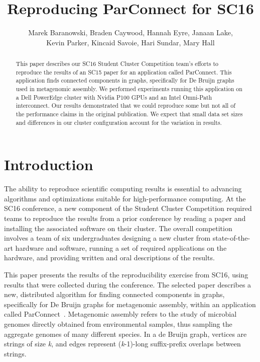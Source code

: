 \documentclass[11pt]{elsarticle}
\title{Reproducing ParConnect for SC16}
\author{Marek Baranowski, Braden Caywood, Hannah Eyre, Janaan Lake, \\Kevin Parker, Kincaid Savoie, Hari Sundar, Mary Hall}
\begin{document}
\begin{abstract}
This paper describes our SC16 Student Cluster Competition team's efforts to reproduce the results of
an SC15 paper for an application called ParConnect.  This application finds connected components in graphs, specifically for De Bruijn graphs used in metagenomic assembly. We performed experiments running this application on a Dell PowerEdge cluster with Nvidia P100 GPUs and an Intel Omni-Path interconnect. Our results demonstrated that we could reproduce some but not all of the performance claims in the
original publication.  We expect that small data set sizes and differences in our cluster configuration account for the variation
in results.
\end{abstract}
\maketitle

\section{Introduction}
The ability to reproduce scientific computing results is essential to advancing algorithms and optimizations suitable for high-performance
computing.  At the SC16 conference, a new component of the Student Cluster Competition required teams to reproduce the results from 
a prior conference by reading a paper and installing the associated software on their cluster.  The overall competition involves a team of 
six undergraduates designing a new cluster from state-of-the-art hardware and software, running a set of required applications
on the hardware, and providing written and oral descriptions of the results.

This paper presents the results of the reproducibility exercise from SC16, using results that were collected during the conference.  The 
selected paper describes a new, distributed algorithm for finding connected components in graphs, specifically for De Bruijn graphs for
metagenomic assembly, within an application called ParConnect~\cite{Flick:2015}. Metagenomic assembly refers to the study of microbial
genomes directly obtained from environmental samples, thus sampling the aggregate genomes of many different species.  In a de Bruijn 
graph, vertices are strings of size \textit{k}, and edges represent (\textit{k}-1)-long suffix-prefix overlaps between strings.
\end{document}
